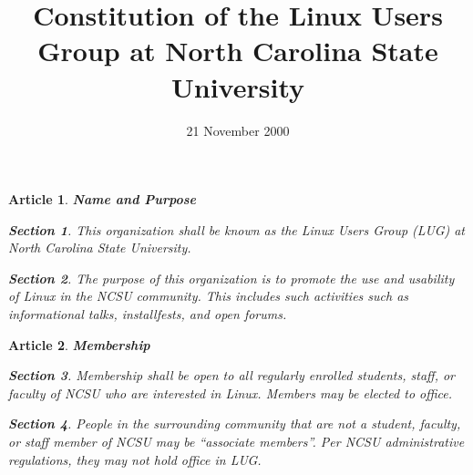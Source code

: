 \oddsidemargin=0in
\evensidemargin=0in
\setlength{\textwidth}{6.5in}
\topmargin=-0.25in
\setlength{\textheight}{8.5in}
\pagestyle{plain}


\newtheorem{art}{Article}
\newtheorem{sect}{Section}[art]


\bigskip

\title{Constitution of the Linux Users Group at North Carolina State University} 
\author{}
\date{21 November 2000}
\maketitle

\bigskip
\bigskip

\begin{art} {\bf Name and Purpose}
\label{art-name}

\begin{sect}
This organization shall be known as the Linux Users Group (LUG) at North Carolina State University.
\end{sect}

\begin{sect}
The purpose of this organization is to promote the use and usability of Linux
in the NCSU community.  This includes such activities such as informational talks, installfests, and open forums.
\end{sect}

\end{art}

\bigskip
\begin{art} {\bf Membership}
\label{art-memb}

\begin{sect}
Membership shall be open to all regularly enrolled students, staff, or faculty of NCSU who are interested in Linux.  Members may be elected to office.
\end{sect}

\begin{sect}
People in the surrounding community that are not a student, faculty,
or staff member of NCSU may be ``associate members''.  Per NCSU administrative regulations, they may not hold office in LUG.
\end{sect}

\end{art}

